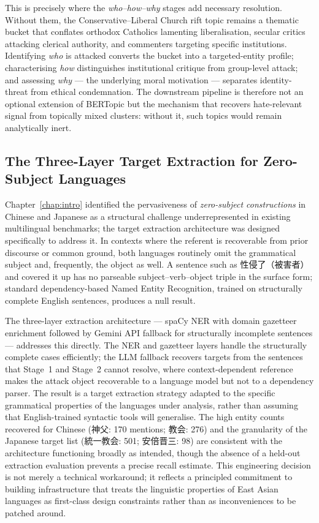 \documentclass[../CLthesis.tex]{subfiles}
\begin{document}
This is precisely where the \emph{who--how--why} stages add necessary resolution. Without them, the Conservative--Liberal Church rift topic remains a thematic bucket that conflates orthodox Catholics lamenting liberalisation, secular critics attacking clerical authority, and commenters targeting specific institutions. Identifying \emph{who} is attacked converts the bucket into a targeted-entity profile; characterising \emph{how} distinguishes institutional critique from group-level attack; and assessing \emph{why} --- the underlying moral motivation --- separates identity-threat from ethical condemnation. The downstream pipeline is therefore not an optional extension of BERTopic but the mechanism that recovers hate-relevant signal from topically mixed clusters: without it, such topics would remain analytically inert.

\subsection{The Three-Layer Target Extraction for Zero-Subject Languages}

Chapter~\ref{chap:intro} identified the pervasiveness of \emph{zero-subject constructions} in Chinese and Japanese as a structural challenge underrepresented in existing multilingual benchmarks; the target extraction architecture was designed specifically to address it. In contexts where the referent is recoverable from prior discourse or common ground, both languages routinely omit the grammatical subject and, frequently, the object as well. A sentence such as 性侵了（被害者）and covered it up has no parseable subject--verb--object triple in the surface form; standard dependency-based Named Entity Recognition, trained on structurally complete English sentences, produces a null result.

The three-layer extraction architecture --- spaCy NER with domain gazetteer enrichment followed by Gemini API fallback for structurally incomplete sentences --- addresses this directly. The NER and gazetteer layers handle the structurally complete cases efficiently; the LLM fallback recovers targets from the sentences that Stage~1 and Stage~2 cannot resolve, where context-dependent reference makes the attack object recoverable to a language model but not to a dependency parser. The result is a target extraction strategy adapted to the specific grammatical properties of the languages under analysis, rather than assuming that English-trained syntactic tools will generalise. The high entity counts recovered for Chinese (神父: 170 mentions; 教会: 276) and the granularity of the Japanese target list (統一教会: 501; 安倍晋三: 98) are consistent with the architecture functioning broadly as intended, though the absence of a held-out extraction evaluation prevents a precise recall estimate. This engineering decision is not merely a technical workaround; it reflects a principled commitment to building infrastructure that treats the linguistic properties of East Asian languages as first-class design constraints rather than as inconveniences to be patched around.
\end{document}
